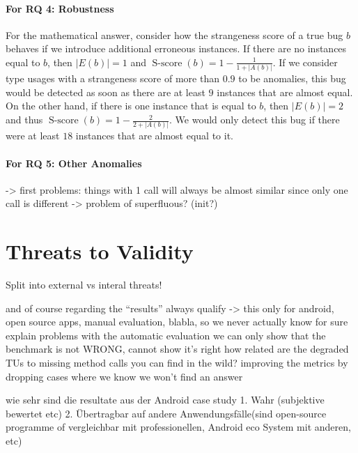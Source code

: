 \paragraph{For RQ 4: Robustness}

For the mathematical answer, consider how the strangeness score of a true bug $b$ behaves if we introduce additional erroneous instances.
If there are no instances equal to $b$, then $|E(b)|=1$ and $\operatorname{S-score}(b)=1-\frac{1}{1+|A(b)|}$.
If we consider type usages with a strangeness score of more than $0.9$ to be anomalies, this bug would be detected as soon as there are at least $9$ instances that are almost equal.
On the other hand, if there is one instance that is equal to $b$, then $|E(b)|=2$ and thus $\operatorname{S-score}(b)=1-\frac{2}{2+|A(b)|}$.
We would only detect this bug if there were at least $18$ instances that are almost equal to it.

\paragraph{For RQ 5: Other Anomalies}

    -> first problems: things with 1 call will always be almost similar since only one call is different
    -> problem of superfluous? (init?)

\section{Threats to Validity}

Split into external vs interal threats!

and of course regarding the ``results'' always qualify -> this only for android, open source apps, manual evaluation, blabla, so we never actually know for sure
explain problems with the automatic evaluation
    we can only show that the benchmark is not WRONG, cannot show it's right
how related are the degraded TUs to missing method calls you can find in the wild?
improving the metrics by dropping cases where we know we won't find an answer

wie sehr sind die resultate aus der Android case study 1. Wahr (subjektive bewertet etc) 2. Übertragbar auf andere Anwendungsfälle(sind open-source programme of vergleichbar mit professionellen, Android eco System mit anderen, etc)


